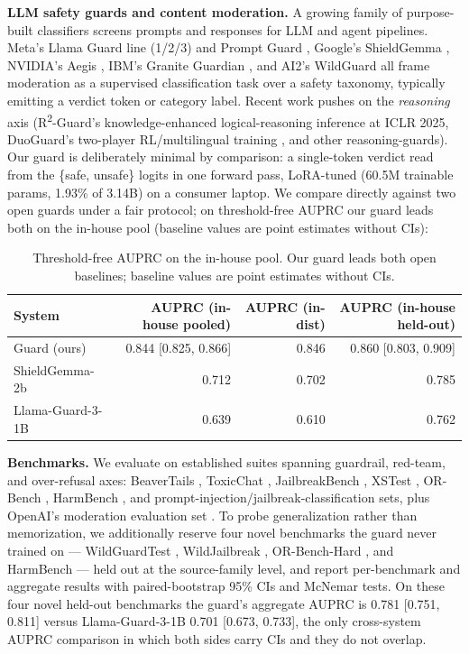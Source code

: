 \documentclass[sigconf,nonacm]{acmart}
\begin{document}
\textbf{LLM safety guards and content moderation.} A growing family of purpose-built classifiers screens prompts and responses for LLM and agent pipelines. Meta's Llama Guard line (1/2/3) \cite{inan2023llamaguard,meta2024llamaguard2_3,fedorov2024llamaguard3_1b} and Prompt Guard \cite{meta2024promptguard}, Google's ShieldGemma \cite{zeng2024shieldgemma}, NVIDIA's Aegis \cite{ghosh2024aegis}, IBM's Granite Guardian \cite{padhi2024graniteguardian}, and AI2's WildGuard \cite{han2024wildguard} all frame moderation as a supervised classification task over a safety taxonomy, typically emitting a verdict token or category label. Recent work pushes on the \emph{reasoning} axis (R\textsuperscript{2}-Guard's knowledge-enhanced logical-reasoning inference \cite{kang2025r2guard} at ICLR 2025, DuoGuard's two-player RL/multilingual training \cite{deng2025duoguard}, and other reasoning-guards). Our guard is deliberately minimal by comparison: a single-token verdict read from the \{safe, unsafe\} logits in one forward pass, LoRA-tuned (60.5M trainable params, 1.93\% of 3.14B) on a consumer laptop. We compare directly against two open guards under a fair protocol; on threshold-free AUPRC our guard leads both on the in-house pool (baseline values are point estimates without CIs):

\begin{table}[t]
\centering
\small
\caption{Threshold-free AUPRC on the in-house pool. Our guard leads both open baselines; baseline values are point estimates without CIs.}
\label{tab:related-inhouse-auprc}
\begin{tabular}{lrrr}
\toprule
System & AUPRC (in-house pooled) & AUPRC (in-dist) & AUPRC (in-house held-out) \\
\midrule
Guard (ours) & 0.844 [0.825, 0.866] & 0.846 & 0.860 [0.803, 0.909] \\
ShieldGemma-2b & 0.712 & 0.702 & 0.785 \\
Llama-Guard-3-1B & 0.639 & 0.610 & 0.762 \\
\bottomrule
\end{tabular}
\end{table}

\textbf{Benchmarks.} We evaluate on established suites spanning guardrail, red-team, and over-refusal axes: BeaverTails \cite{ji2023beavertails}, ToxicChat \cite{lin2023toxicchat}, JailbreakBench \cite{chao2024jailbreakbench}, XSTest \cite{rottger2024xstest}, OR-Bench \cite{cui2024orbench}, HarmBench \cite{mazeika2024harmbench}, and prompt-injection/jailbreak-classification sets, plus OpenAI's moderation evaluation set \cite{markov2023holistic}. To probe generalization rather than memorization, we additionally reserve four novel benchmarks the guard never trained on --- WildGuardTest \cite{han2024wildguard}, WildJailbreak \cite{jiang2024wildteaming}, OR-Bench-Hard \cite{cui2024orbench}, and HarmBench \cite{mazeika2024harmbench} --- held out at the source-family level, and report per-benchmark and aggregate results with paired-bootstrap 95\% CIs and McNemar tests. On these four novel held-out benchmarks the guard's aggregate AUPRC is 0.781 [0.751, 0.811] versus Llama-Guard-3-1B 0.701 [0.673, 0.733], the only cross-system AUPRC comparison in which both sides carry CIs and they do not overlap.
\end{document}
